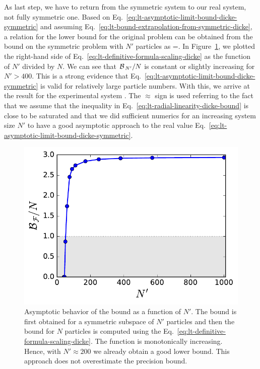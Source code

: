 As last step, we have to return from the symmetric system to our real system, not fully symmetric one.
Based on Eq.~\eqref{eq:lt-asymptotic-limit-bound-dicke-symmetric} and assuming Eq.~\eqref{eq:lt-bound-extrapolation-from-symmetric-dicke}, a relation for the lower bound for the original problem can be obtained from the bound on the symmetric problem with $N'$ particles as
\be
  \label{eq:lt-definitive-formula-scaling-dicke}
  \approx {}  =.
\ee
In Figure~\ref{fig:assimpthotic-approach-to-the-bound-from-scaled-dicke},
we plotted the right-hand side of Eq.~\eqref{eq:lt-definitive-formula-scaling-dicke} as the function of $N'$ divided by $N$.
We can see that $\mathcal{B}_{\, N' }/N$ is constant or slightly increasing for $N'>400$.
This is a strong evidence that Eq.~\eqref{eq:lt-asymptotic-limit-bound-dicke-symmetric} is valid for relatively large particle numbers.
With this, we arrive at the result for the experimental system
\be
  \label{eq:lt-result-experimental-dicke}
  .
\ee
The $\approx$ sign is used referring to the fact that we assume that the inequality in Eq.~\eqref{eq:lt-radial-linearity-dicke-bound} is close to be saturated and that we did sufficient numerics for an increasing system size $N'$ to have a good asymptotic approach to the real value Eq.~\eqref{eq:lt-asymptotic-limit-bound-dicke-symmetric}.
\begin{figure}[htp]
  \centering
  \includegraphics[scale=.65]{img/LT_dicke_7900_asymp.pdf}
  \caption[Asymptotic behavior of the bound for increasing size systems for Dicke like experimental data]{
  Asymptotic behavior of the bound as a function of $N'$.
  The bound is first obtained for a symmetric subspace of $N'$ particles and then the bound for $N$ particles is computed using the Eq.~\eqref{eq:lt-definitive-formula-scaling-dicke}.
  The function is monotonically increasing.
  Hence, with $N'\approx200$ we already obtain a good lower bound.
  This approach does not overestimate the precision bound.
  }
  \label{fig:assimpthotic-approach-to-the-bound-from-scaled-dicke}
\end{figure}

